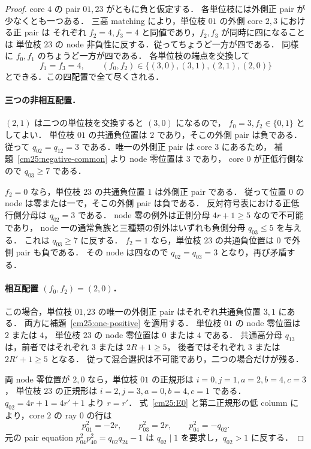 \begin{proof}
core $4$ の pair $01,23$ がともに負と仮定する．
各単位枝には外側正 pair が少なくとも一つある．
三高 matching により，単位枝 $01$ の外側 core $2,3$ における正 pair は
それぞれ $f_2=4,f_3=4$ と同値であり，$f_2,f_3$ が同時に四になることは
単位枝 $23$ の node 非負性に反する．従ってちょうど一方が四である．
同様に $f_0,f_1$ のちょうど一方が四である．
各単位枝の端点を交換して
\begin{equation}\label{cm25:four-sign-cases}
 f_1=f_3=4,\qquad (f_0,f_2)\in\{(3,0),(3,1),(2,1),(2,0)\}
\end{equation}
とできる．この四配置で全て尽くされる．

\paragraph{三つの非相互配置．}
$(2,1)$ は二つの単位枝を交換すると $(3,0)$ になるので，
$f_0=3,f_2\in\{0,1\}$ としてよい．
単位枝 $01$ の共通負位置は $2$ であり，そこの外側 pair は負である．
従って $q_{02}=q_{12}=3$ である．唯一の外側正 pair は core $3$ にあるため，
補題~\ref{cm25:negative-common} より node 零位置は $3$ であり，
core $0$ が正低行側なので $q_{03}\ge7$ である．

$f_2=0$ なら，単位枝 $23$ の共通負位置 $1$ は外側正 pair である．
従って位置 $0$ の node は零または一で，そこの外側 pair は負である．
反対符号表における正低行側分母は $q_{02}=3$ である．
node 零の例外は正側分母 $4r+1\ge5$ なので不可能であり，
node 一の通常負族と三種類の例外はいずれも負側分母 $q_{03}\le5$ を与える．
これは $q_{03}\ge7$ に反する．
$f_2=1$ なら，単位枝 $23$ の共通負位置は $0$ で外側 pair も負である．
その node は四なので $q_{02}=q_{03}=3$ となり，再び矛盾する．

\paragraph{相互配置 $(f_0,f_2)=(2,0)$．}
この場合，単位枝 $01,23$ の唯一の外側正 pair はそれぞれ共通負位置 $3,1$ にある．
両方に補題~\ref{cm25:one-positive} を適用する．
単位枝 $01$ の node 零位置は $2$ または $4$，
単位枝 $23$ の node 零位置は $0$ または $4$ である．
共通高分母 $q_{13}$ は，前者ではそれぞれ $3$ または $2R+1\ge5$，
後者ではそれぞれ $3$ または $2R'+1\ge5$ となる．
従って混合選択は不可能であり，二つの場合だけが残る．

両 node 零位置が $2,0$ なら，単位枝 $01$ の正規形は $i=0,j=1,a=2,b=4,c=3$，
単位枝 $23$ の正規形は $i=2,j=3,a=0,b=4,c=1$ である．
$q_{02}=4r+1=4r'+1$ より $r=r'$．
式~\eqref{cm25:E0} と第二正規形の低 column により，core $2$ の ray $0$ の行は
\[
 p^2_{01}=-2r,\qquad p^2_{03}=2r,\qquad
 p^2_{04}=-q_{02}.
\]
元の pair equation
$p^2_{04}p^2_{40}=q_{02}q_{24}-1$ は
$q_{02}\mid1$ を要求し，$q_{02}>1$ に反する．


\end{proof}

